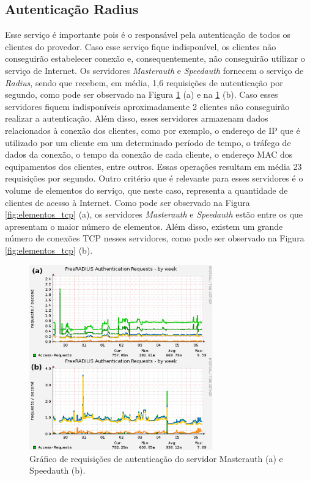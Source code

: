 \subsection{Autenticação Radius}
\label{section:radius}

Esse serviço é importante pois é o responsável pela autenticação de todos os clientes do provedor. Caso esse serviço fique indisponível, 
os clientes não conseguirão estabelecer conexão e, consequentemente, não conseguirão utilizar o serviço de Internet. Os servidores 
\textit{Masterauth} e \textit{Speedauth} fornecem o serviço de \textit{Radius}, sendo que recebem, em média, 1,6 requisições de autenticação 
por segundo, como pode ser observado na Figura \ref{fig:freeradius_auth} (a) e na \ref{fig:freeradius_auth} (b). Caso esses servidores fiquem 
indisponíveis aproximadamente 2 clientes não conseguirão realizar a autenticação. Além disso, esses servidores armazenam dados relacionados à 
conexão dos clientes, como por exemplo, o endereço de \ac{IP} que é utilizado por um cliente em um determinado período de tempo, o tráfego de 
dados da conexão, o tempo da conexão de cada cliente, o endereço \ac{MAC} dos equipamentos dos clientes, entre outros. Essas operações resultam 
em média 23 requisições por segundo. %
Outro critério que é relevante para esses servidores é o volume de elementos do serviço, que neste caso, representa a quantidade de clientes de
acesso à Internet. Como pode ser observado na Figura \ref{fig:elementos_tcp} (a), os servidores \textit{Masterauth} e \textit{Speedauth}
estão entre os que apresentam o maior número de elementos. Além disso, existem um grande número de conexões \ac{TCP} nesses servidores, como 
pode ser observado na Figura \ref{fig:elementos_tcp} (b).

\begin{figure}[h!]
 \centering
 \includegraphics[width=300px]{img/freeradius_auth.eps}
 \caption{Gráfico de requisições de autenticação do servidor Masterauth (a) e Speedauth (b).}
 \label{fig:freeradius_auth}
\end{figure}

